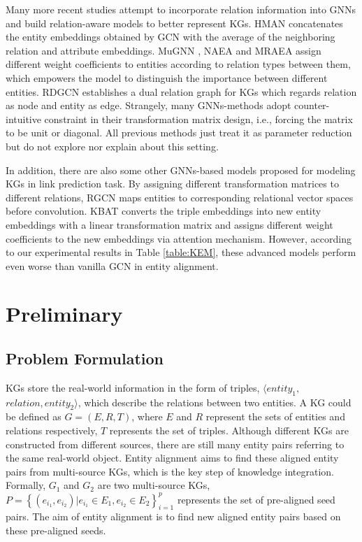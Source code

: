 \documentclass[sigconf,camera-ready]{acmart}
\begin{document}
Many more recent studies attempt to incorporate relation information into GNNs and build relation-aware models to better represent KGs.
HMAN \cite{yang2019aligning} concatenates the entity embeddings obtained by GCN with the average of the neighboring relation and attribute embeddings.
MuGNN \cite{DBLP:conf/acl/CaoLLLLC19}, NAEA \cite{DBLP:conf/ijcai/ZhuZ0TG19} and MRAEA \cite{DBLP:conf/wsdm/MaoWXLW20} assign different weight coefficients to entities according to relation types between them, which empowers the model to distinguish the importance between different entities.
RDGCN \cite{DBLP:conf/ijcai/WuLF0Y019} establishes a dual relation graph for KGs which regards relation as node and entity as edge.
Strangely, many GNNs-methods \cite{DBLP:conf/acl/CaoLLLLC19,DBLP:conf/emnlp/WangLLZ18,li-etal-2019-semi,yang2019aligning,DBLP:conf/wsdm/MaoWXLW20} adopt counter-intuitive constraint in their transformation matrix design,
i.e., forcing the matrix to be unit or diagonal.
All previous methods just treat it as parameter reduction but do not explore nor explain about this setting.

In addition, there are also some other GNNs-based models proposed for modeling KGs in link prediction task.
By assigning different transformation matrices to different relations, RGCN \cite{DBLP:conf/esws/SchlichtkrullKB18} maps entities to corresponding relational vector spaces before convolution.
KBAT \cite{DBLP:conf/acl/NathaniCSK19} converts the triple embeddings into new entity embeddings with a linear transformation matrix and assigns different weight coefficients to the new embeddings via attention mechanism.
However, according to our experimental results in Table \ref{table:KEM}, these advanced models perform even worse than vanilla GCN in entity alignment.



\section{Preliminary}
\subsection{Problem Formulation}
KGs store the real-world information in the form of triples, $\langle entity_1,$
$relation, entity_2\rangle$, which describe the relations between two entities.
A KG could be defined as $G=(E,R,T)$, where $E$ and $R$ represent the sets of entities and relations respectively, $T$ represents the set of triples.
Although different KGs are constructed from different sources, there are still many entity pairs referring to the same real-world object.
Entity alignment aims to find these aligned entity pairs from multi-source KGs, which is the key step of knowledge integration.
Formally, $G_1$ and $G_2$ are two multi-source KGs, $P=\left\{(e_{i_1},e_{i_2})|e_{i_1}\in E_1,e_{i_2}\in E_2\right\}^p_{i=1}$ represents the set of pre-aligned seed pairs.
The aim of entity alignment is to find new aligned entity pairs based on these pre-aligned seeds.
\end{document}
